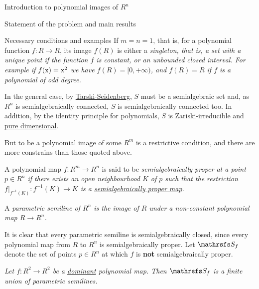 \documentclass[11pt, a4paper, english, twoside, notitlepage, openright]{report}
\begin{document}
\begin{chapter}{Introduction to polynomial images of $R^n$}
\begin{section}{Statement of the problem and main results}
\begin{subsection}{Necessary conditions and examples}
If $m=n=1$, that is, for a polynomial function $f:R\to R$, its image $f(R)$ is either a \em singleton, \em that is, a set with a unique point if the function $f$ is constant, or an unbounded closed interval. For example if $f({\tt x})={\tt x}^2$ we have $f(R)=[0,+\infty)$, and $f(R)=R$ if $f$ is a polynomial of odd degree.
	
In the general case, by \hyperref[tarskiSeidenberg]{Tarski-Seidenberg}, $S$ must be a semialgebraic set and, as $R^n$ is semialgebraically connected, $S$ is semialgebraically connected too. In addition, by the identity principle for polynomials, $S$ is Zariski-irreducible and \hyperref[pureDim]{pure dimensional}.
	
	
But to be a polynomial image of some $R^m$ is a restrictive condition, and there are more constrains than those quoted above. 
	
\begin{definition} A polynomial map $f:R^m\to R^n$ is said to be \em semialgebraically proper at a point $p\in R^n$ \em if there exists an open neighbourhood $K$ of $p$ such that the restriction $f|_{f^{-1}(K)}:f^{-1}(K)\to K$ is a \hyperref[properMap]{semialgebraically proper map}.
\end{definition}
	
\begin{definition} A \em parametric semiline \em of $R^n$ is the image of $R$ under a non-constant polynomial map $R\to R^n$.
\end{definition}
	
It is clear that every parametric semiline is semialgebraically closed, since every polynomial map from $R$ to $R^n$ is semialgebraically proper. Let $\S_f$ denote the set of points $p\in R^n$ at which $f$ is \textbf{not} semialgebraically proper.
	
\begin{theorem}[\em Jelonek\em]\label{jelonek}\em Let $f:R^2\to R^2$ be a \hyperref[dominant]{dominant} polynomial map. Then $\S_f$ is a finite union of parametric semilines.\em
\end{theorem}
	

\end{subsection}
\end{section}
\end{chapter}
\end{document}
